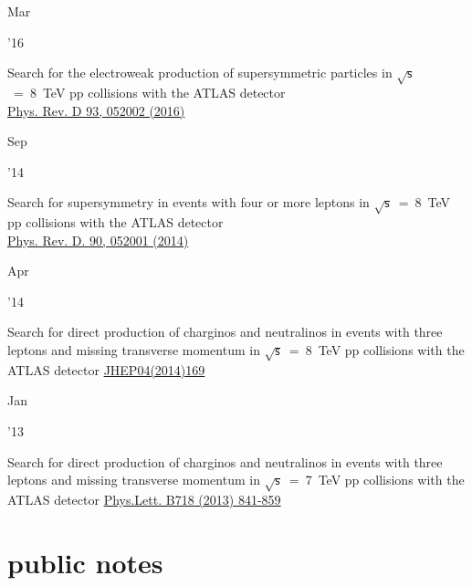 \documentclass[]{cv} %
\begin{document}
\begin{entrylist}
  \entry
  {\parbox[t]{\parboxWidthOne}{Mar}\parbox[t]{\parboxWidthTwo}{\hfill '16}}
  {Search for the electroweak production of supersymmetric particles in
    $\sqrt{\mathsf{s}}$~=~8~TeV pp collisions with the ATLAS detector\\}
    {\href{https://journals.aps.org/prd/abstract/10.1103/PhysRevD.93.052002}{Phys. Rev. D 93, 052002 (2016)}}
  {\vspace*{\spacingPubs}}

  \entry
  {\parbox[t]{\parboxWidthOne}{Sep}\parbox[t]{\parboxWidthTwo}{\hfill '14}}
  {Search for supersymmetry in events with four or more leptons in $\sqrt{\mathsf{s}}$~=~8~TeV pp collisions with the ATLAS detector\\}
  {\href{https://journals.aps.org/prd/abstract/10.1103/PhysRevD.90.052001}{Phys. Rev. D. 90, 052001 (2014)}}
  {\vspace*{\spacingPubs}}

  \entry
  {\parbox[t]{\parboxWidthOne}{Apr}\parbox[t]{\parboxWidthTwo}{\hfill '14}}
  {Search for direct production of charginos and neutralinos in events with three leptons and missing transverse momentum in $\sqrt{\mathsf{s}}$~=~8~TeV pp collisions with the ATLAS detector}
{\href{https://link.springer.com/article/10.1007\%2FJHEP04\%282014\%29169}{JHEP04(2014)169}}
{\vspace*{\spacingPubs}}

    \entry
    {\parbox[t]{\parboxWidthOne}{Jan}\parbox[t]{\parboxWidthTwo}{\hfill '13}}
    {Search for direct production of charginos and neutralinos in events with three leptons and missing transverse momentum in $\sqrt{\mathsf{s}}$~=~7~TeV pp collisions with the ATLAS detector}
  {\href{https://www.sciencedirect.com/science/article/pii/S037026931201204X}{Phys.Lett. B718 (2013) 841-859}}
  {\vspace*{\spacingPubs}}

\end{entrylist}

\newpage

\section{public notes}
\end{document}
